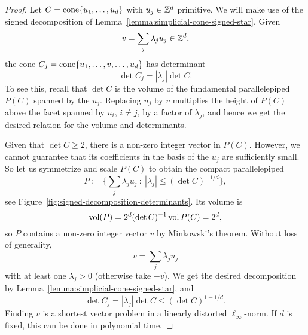 \begin{proof}
  Let $C = \operatorname{cone}\{ u_1, \ldots, u_d \}$ with $u_j \in \mathbb{Z}^d$ primitive.
  We will make use of the signed decomposition of Lemma~\ref{lemma:simplicial-cone-signed-star}.
  Given
  \[
    v = \sum_j \lambda_j u_j \in \mathbb{Z}^d,
  \]
  the cone $C_j = \operatorname{cone}\{u_1,\ldots,v,\ldots,u_d\}$ has determinant
  \[
    \det C_j = |\lambda_j| \det C.
  \]
  To see this, recall that $\det C$ is the volume of the fundamental parallelepiped $P(C)$ spanned by the $u_j$.
  Replacing $u_j$ by $v$ multiplies the height of $P(C)$ above the facet spanned by $u_i$, $i \neq j$,
  by a factor of $\lambda_j$, and hence we get the desired relation for the volume and determinants.

  Given that $\det C \geq 2$, there is a non-zero integer vector in $P(C)$.
  However, we cannot guarantee that its coefficients in the basis of the $u_j$ are sufficiently small.
  So let us symmetrize and scale $P(C)$ to obtain the compact parallelepiped
  \[
    P := \{ \sum_j \lambda_j u_j ~:~ |\lambda_j| \leq (\det C)^{-1/d} \},
  \]
  see Figure~\ref{fig:signed-decomposition-determinants}.
  Its volume is
  \[
    \operatorname{vol}(P) = 2^d (\det C)^{-1} \operatorname{vol} P(C) = 2^d,
  \]
  so $P$ contains a non-zero integer vector $v$ by Minkowski's theorem.
  Without loss of generality,
  \[
    v = \sum_j \lambda_j u_j
  \]
  with at least one $\lambda_j > 0$ (otherwise take $-v$).
  We get the desired decomposition by Lemma~\ref{lemma:simplicial-cone-signed-star},
  and
  \[
    \det C_j = |\lambda_j| \det C \leq (\det C)^{1-1/d}.
  \]
  Finding $v$ is a shortest vector problem in a linearly distorted $\ell_\infty$-norm.
  If $d$ is fixed, this can be done in polynomial time.
\end{proof}

